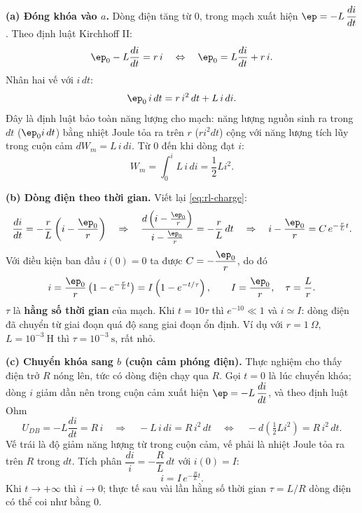 \begin{enumerate}
\textbf{(a) Đóng khóa vào $a$.} Dòng điện tăng từ 0, trong mạch xuất hiện $\ep = -L\,\dfrac{di}{dt}$. Theo định luật Kirchhoff II:
\begin{equation}\label{eq:rl-charge}
\ep_0 - L\frac{di}{dt} = r\,i
\quad\Leftrightarrow\quad
\ep_0 = L\frac{di}{dt} + r\,i.
\end{equation}
Nhân hai vế với $i\,dt$:
\[
\ep_0\,i\,dt = r\,i^2\,dt + L\,i\,di.
\]
Đây là định luật bảo toàn năng lượng cho mạch: năng lượng nguồn sinh ra trong $dt$ ($\ep_0 i\,dt$) bằng nhiệt Joule tỏa ra trên $r$ ($r i^2 dt$) cộng với năng lượng tích lũy trong cuộn cảm $dW_m = L\,i\,di$. Từ $0$ đến khi dòng đạt $i$:
\[
\boxed{W_m = \int_0^i L\,i\,di = \frac12 L i^2}.
\]

\textbf{(b) Dòng điện theo thời gian.} Viết lại \cref{eq:rl-charge}:
\[
\frac{di}{dt} = -\frac{r}{L}\left(i - \frac{\ep_0}{r}\right)
\quad\Rightarrow\quad
\frac{d\left(i - \frac{\ep_0}{r}\right)}{i - \frac{\ep_0}{r}} = -\frac{r}{L}\,dt
\quad\Rightarrow\quad
i - \frac{\ep_0}{r} = C\,e^{-\frac{r}{L}t}.
\]
Với điều kiện ban đầu $i(0) = 0$ ta được $C = -\dfrac{\ep_0}{r}$, do đó
\[
i = \frac{\ep_0}{r}\left(1 - e^{-\frac{r}{L}t}\right) = I\left(1 - e^{-t/\tau}\right),
\qquad
I = \frac{\ep_0}{r},\quad \tau = \frac{L}{r}.
\]
$\tau$ là \textbf{hằng số thời gian} của mạch. Khi $t = 10\tau$ thì $e^{-10} \ll 1$ và $i \simeq I$: dòng điện đã chuyển từ giai đoạn quá độ sang giai đoạn ổn định. Ví dụ với $r = 1\ \Omega$, $L = 10^{-3}\ \text{H}$ thì $\tau = 10^{-3}\ \text{s}$, rất nhỏ.

\textbf{(c) Chuyển khóa sang $b$ (cuộn cảm phóng điện).} Thực nghiệm cho thấy điện trở $R$ nóng lên, tức có dòng điện chạy qua $R$. Gọi $t = 0$ là lúc chuyển khóa; dòng $i$ giảm dần nên trong cuộn cảm xuất hiện $\ep = -L\,\dfrac{di}{dt}$, và theo định luật Ohm
\[
U_{DB} = -L\frac{di}{dt} = R\,i
\quad\Rightarrow\quad
-L\,i\,di = R\,i^2\,dt
\quad\Leftrightarrow\quad
-d\left(\tfrac12 L i^2\right) = R\,i^2\,dt.
\]
Vế trái là độ giảm năng lượng từ trong cuộn cảm, vế phải là nhiệt Joule tỏa ra trên $R$ trong $dt$. Tích phân $\dfrac{di}{i} = -\dfrac{R}{L}\,dt$ với $i(0) = I$:
\[
i = I\,e^{-\frac{R}{L}t}.
\]
Khi $t \to +\infty$ thì $i \to 0$; thực tế sau vài lần hằng số thời gian $\tau = L/R$ dòng điện có thể coi như bằng 0.
\end{enumerate}
